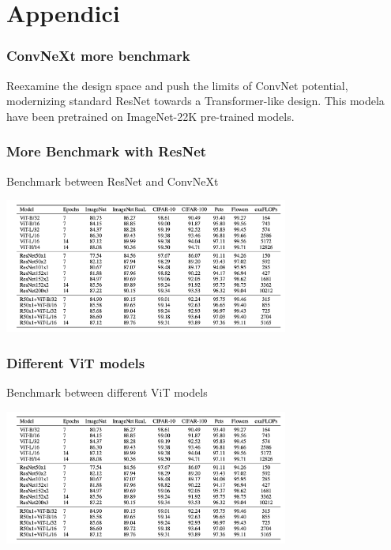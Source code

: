 \section{Appendici}

\begin{frame}
\frametitle{ConvNeXt more benchmark}
Reexamine the design space and push the limits of ConvNet potential, modernizing  standard ResNet towards a Transformer-like design.
This modela have been pretrained on ImageNet-22K pre-trained models.





\begin{frame}
\frametitle{More Benchmark with ResNet}
Benchmark between ResNet and ConvNeXt
\begin{center}
    \includegraphics[width=0.7\textwidth]{img/4-section/More-benchmark.png}
\end{center}

\end{frame}

\begin{frame}
\frametitle{Different ViT models}
Benchmark between different ViT models
\begin{center}
    \includegraphics[width=0.7\textwidth]{img/4-section/More-benchmark.png}
\end{center}


\end{frame}
\end{frame}
